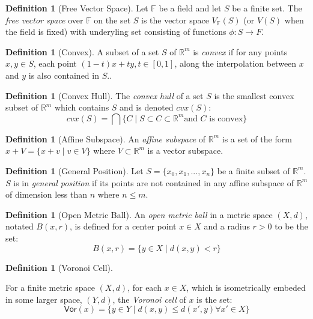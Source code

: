 \documentclass[ma]{uncgdissertationexp}
\theoremstyle{plain}
\theoremstyle{definition}
\newtheorem{definition}[theorem]{Definition}
\theoremstyle{remark}
\begin{document}
\begin{definition}[Free Vector Space]
\par Let $\mathbb{F}$ be a field and let $S$ be a finite set. The \textit{free vector space} over $\mathbb{F}$ on the set $S$ is the vector space $V_{\mathbb{F}}(S)$ (or $V(S)$ when the field is fixed) with underyling set consisting of functions $\phi: S \rightarrow F$.
\end{definition}

\begin{definition}[Convex]
\par A subset of a set $S$ of $\mathbb{R}^m$ is \textit{convex} if for any points $x, y \in S$, each point $(1-t)x+ty, t\in [0,1]$, along the interpolation between $x$ and $y$ is also contained in $S$..
\end{definition}

\begin{definition}[Convex Hull]
\par The \textit{convex hull} of a set $S$ is the smallest convex subset of $\mathbb{R}^m$ which contains $S$ and is denoted $cvx(S)$:
$$cvx(S) = \bigcap\{C \mid S\subset C \subset \mathbb{R}^m \text{and } C \text{ is convex}\}$$
\end{definition}

\begin{definition}[Affine Subspace]
\par An \textit{affine subspace} of $\mathbb{R}^m$ is a set of the form
$x+V = \{x + v \mid v\in V\}$ where $V\subset\mathbb{R}^m$ is a vector subspace.
\end{definition}

\begin{definition}[General Position]
Let $S=\{x_0, x_1, ..., x_n\}$ be a finite subset of $\mathbb{R}^m$. $S$ is in \textit{general position} if its points are not contained in any affine subspace of $\mathbb{R}^m$ of dimension less than $n$ where $n\leq m$.
\end{definition}

\begin{definition}[Open Metric Ball]
\par An \textit{open metric ball} in a metric space $(X, d)$, notated $B(x, r)$, is defined for a center point $x\in X$ and a radius $r>0$ to be the set:
$$B(x,r) = \{y\in X \mid d(x,y)<r\}$$
\end{definition}

\begin{definition}[Voronoi Cell]
\label{def:voronoi}
\par For a finite metric space $(X, d)$, for each $x\in X$, which is isometrically embeded in some larger space, $(Y,d)$, the \textit{Voronoi cell} of $x$ is the set:
$$\mathsf{Vor}(x) = \{y\in Y \mid d(x,y) \leq d(x', y) \forall x' \in X\}$$
\end{definition}
\end{document}
